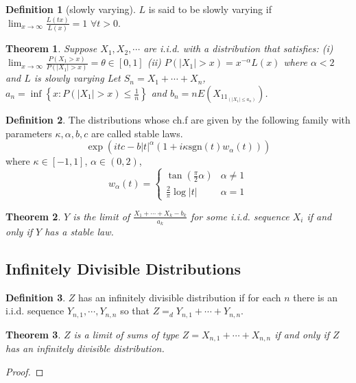 \documentclass{article}
\newtheorem{Thm}{Theorem}[section]
\theoremstyle{definition}
\newtheorem{Def}{Definition}[section]
\begin{document}
\begin{Def}[slowly varying]
    $L$ is said to be slowly varying if $\lim_{x\to\infty}\frac{L(tx)}{L(x)}=1$ $\forall t>0$.
\end{Def}

\begin{Thm}
    Suppose $X_1,X_2,\cdots$ are i.i.d. with a distribution that satisfies:\newline 
    (i) $\lim_{x\to\infty}\frac{P(X_1>x)}{P(\left|X_1\right|>x)}=\theta\in [0,1]$\newline 
    (ii) $P(\left|X_1\right|>x)=x^{-\alpha}L(x)$ where $\alpha<2$ and $L$ is slowly varying\newline 
    Let $S_n=X_1+\cdots+X_n$, $a_n=\inf\left\{x:P(\left|X_1\right|>x)\le \frac{1}{n}\right\}$ and $b_n=nE(X_11_{(\left|X_1\right|\le a_n)})$.
\end{Thm}

\begin{Def}
    The distributions whose ch.f are given by the following family with parameters $\kappa,\alpha,b,c$ are called stable laws.
    \[\exp{(itc-b\left|t\right|^\alpha(1+i\kappa\text{sgn}(t)w_\alpha(t)))}\] 
    where $\kappa\in [-1,1]$, $\alpha\in (0,2)$,
    \[w_\alpha(t) =\left\{\begin{matrix}
        \tan(\frac{\pi}{2}\alpha )  & \alpha \ne 1\\
         \frac{2}{\pi}\log\left|t\right| &\alpha =1
       \end{matrix}\right.\]
\end{Def}

\begin{Thm}
    $Y$ is the limit of $\frac{X_1+\cdots+X_k-b_k}{a_k}$ for some i.i.d. sequence $X_i$ if and only if $Y$ has a stable law.
\end{Thm}

\subsection{Infinitely Divisible Distributions}
\begin{Def}
    $Z$ has an infinitely divisible distribution if for each $n$ there is an i.i.d. sequence $Y_{n,1},\cdots,Y_{n,n}$ so that $Z=_d Y_{n,1}+\cdots+Y_{n,n}$.
\end{Def}
\begin{Thm}
    $Z$ is a limit of sums of type $Z=X_{n,1}+\cdots+X_{n,n}$ if and only if $Z$ has an infinitely divisible distribution.
\end{Thm}
\begin{proof}
    
\end{proof}
\end{document}
